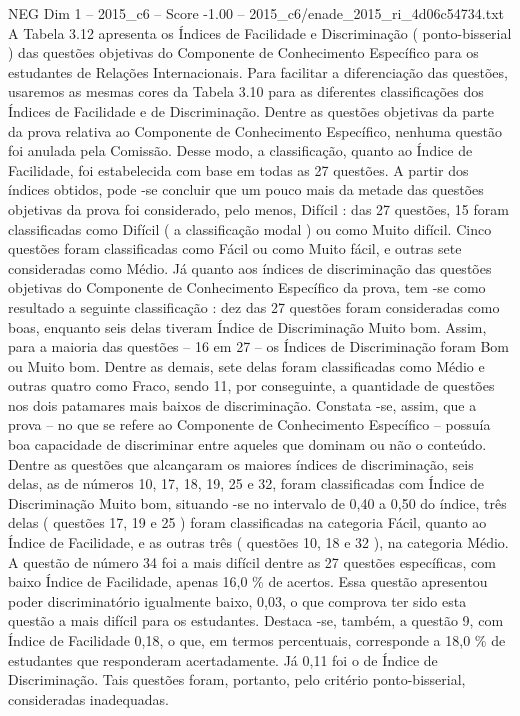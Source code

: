 \begin{textsample}{NEG Dim 1 – 2015\_c6 – Score -1.00 – 2015\_c6/enade\_2015\_ri\_4d06c54734.txt}
A Tabela 3.12 apresenta os Índices de Facilidade e Discriminação ( ponto-bisserial ) das questões objetivas do Componente de Conhecimento Específico para os estudantes de Relações Internacionais.
Para facilitar a diferenciação das questões, usaremos as mesmas cores da Tabela 3.10 para as diferentes classificações dos Índices de Facilidade e de Discriminação.
Dentre as questões objetivas da parte da prova relativa ao Componente de Conhecimento Específico, nenhuma questão foi anulada pela Comissão.
Desse modo, a classificação, quanto ao Índice de Facilidade, foi estabelecida com base em todas as 27 questões.
A partir dos índices obtidos, pode -se concluir que um pouco mais da metade das questões objetivas da prova foi considerado, pelo menos, Difícil : das 27 questões, 15 foram classificadas como Difícil ( a classificação modal ) ou como Muito difícil.
Cinco questões foram classificadas como Fácil ou como Muito fácil, e outras sete consideradas como Médio.
Já quanto aos índices de discriminação das questões objetivas do Componente de Conhecimento Específico da prova, tem -se como resultado a seguinte classificação : dez das 27 questões foram consideradas como boas, enquanto seis delas tiveram Índice de Discriminação Muito bom.
Assim, para a maioria das questões – 16 em 27 – os Índices de Discriminação foram Bom ou Muito bom.
Dentre as demais, sete delas foram classificadas como Médio e outras quatro como Fraco, sendo 11, por conseguinte, a quantidade de questões nos dois patamares mais baixos de discriminação.
Constata -se, assim, que a prova – no que se refere ao Componente de Conhecimento Específico – possuía boa capacidade de discriminar entre aqueles que dominam ou não o conteúdo.
Dentre as questões que alcançaram os maiores índices de discriminação, seis delas, as de números 10, 17, 18, 19, 25 e 32, foram classificadas com Índice de Discriminação Muito bom, situando -se no intervalo de 0,40 a 0,50 do índice, três delas ( questões 17, 19 e 25 ) foram classificadas na categoria Fácil, quanto ao Índice de Facilidade, e as outras três ( questões 10, 18 e 32 ), na categoria Médio.
A questão de número 34 foi a mais difícil dentre as 27 questões específicas, com baixo Índice de Facilidade, apenas 16,0 \% de acertos.
Essa questão apresentou poder discriminatório igualmente baixo, 0,03, o que comprova ter sido esta questão a mais difícil para os estudantes.
Destaca -se, também, a questão 9, com Índice de Facilidade 0,18, o que, em termos percentuais, corresponde a 18,0 \% de estudantes que responderam acertadamente.
Já 0,11 foi o de Índice de Discriminação.
Tais questões foram, portanto, pelo critério ponto-bisserial, consideradas inadequadas.

\end{textsample}
